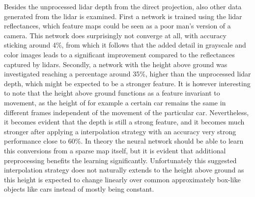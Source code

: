 Besides the unprocessed lidar depth from the direct projection, also other data generated from the lidar is examined. First a network is trained using the lidar reflectances, which feature maps could be seen as a poor man's version of a camera. This network does surprisingly not converge at all, with accuracy sticking around 4\%, from which it follows that the added detail in grayscale and color images leads to a significant improvement compared to the reflectances captured by lidars. Secondly, a network with the height above ground was investigated reaching a percentage around 35\%, higher than the unprocessed lidar depth, which might be expected to be a stronger feature. It is however interesting to note that the height above ground functions as a feature invariant to movement, as the height of for example a certain car remains the same in different frames independent of the movement of the particular car. Nevertheless, it becomes evident that the depth is still a strong feature, and it becomes much stronger after applying a interpolation strategy with an accuracy very strong performance close to 60\%. In theory the neural network should be able to learn this conversions from a sparse map itself, but it is evident that additional preprocessing benefits the learning significantly. Unfortunately this suggested interpolation strategy does not naturally extends to the height above ground as this height is expected to change linearly over common approximately box-like objects like cars instead of mostly being constant. 




